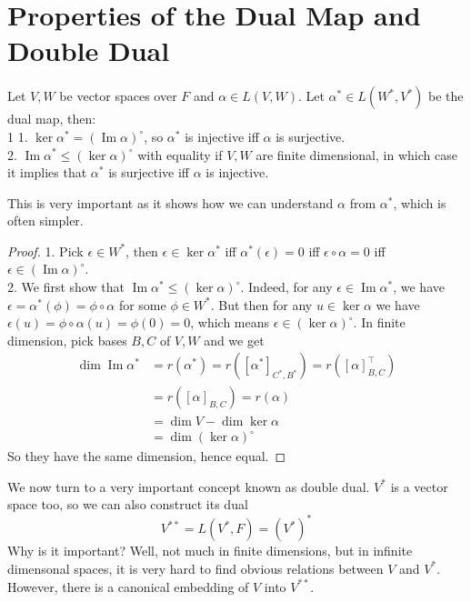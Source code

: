 \section{Properties of the Dual Map and Double Dual}
\begin{lemma}
    Let $V,W$ be vector spaces over $F$ and $\alpha\in L(V,W)$.
    Let $\alpha^\ast\in L(W^\ast,V^\ast)$ be the dual map, then:\\1
    1. $\ker\alpha^\ast=(\operatorname{Im}\alpha)^\circ$, so $\alpha^\ast$ is injective iff $\alpha$ is surjective.\\
    2. $\operatorname{Im}\alpha^\ast\le(\ker\alpha)^\circ$ with equality if $V,W$ are finite dimensional, in which case it implies that $\alpha^\ast$ is surjective iff $\alpha$ is injective.
\end{lemma}
This is very important as it shows how we can understand $\alpha$ from $\alpha^\ast$, which is often simpler.
\begin{proof}
    1. Pick $\epsilon\in W^\ast$, then $\epsilon\in\ker\alpha^\ast$ iff $\alpha^\ast(\epsilon)=0$ iff $\epsilon\circ\alpha=0$ iff $\epsilon\in(\operatorname{Im}\alpha)^\circ$.\\
    2. We first show that $\operatorname{Im}\alpha^\ast\le(\ker\alpha)^\circ$.
    Indeed, for any $\epsilon\in\operatorname{Im}\alpha^\ast$, we have $\epsilon=\alpha^\ast(\phi)=\phi\circ\alpha$ for some $\phi\in W^\ast$.
    But then for any $u\in \ker\alpha$ we have $\epsilon(u)=\phi\circ\alpha(u)=\phi(0)=0$, which means $\epsilon\in(\ker\alpha)^\circ$.
    In finite dimension, pick bases $B,C$ of $V,W$ and we get
    \begin{align*}
        \dim\operatorname{Im}\alpha^\ast&=r(\alpha^\ast)=r([\alpha^\ast]_{C^\ast,B^\ast})=r([\alpha]_{B,C}^\top)\\
        &=r([\alpha]_{B,C})=r(\alpha)\\
        &=\dim V-\dim\ker\alpha\\
        &=\dim (\ker\alpha)^\circ
    \end{align*}
    So they have the same dimension, hence equal.
\end{proof}
We now turn to a very important concept known as double dual.
$V^\ast$ is a vector space too, so we can also construct its dual
$$V^{\ast\ast}=L(V^\ast,F)=(V^\ast)^\ast$$
Why is it important?
Well, not much in finite dimensions, but in infinite dimensonal spaces, it is very hard to find obvious relations between $V$ and $V^\ast$.
However, there is a canonical embedding of $V$ into $V^{\ast\ast}$.
